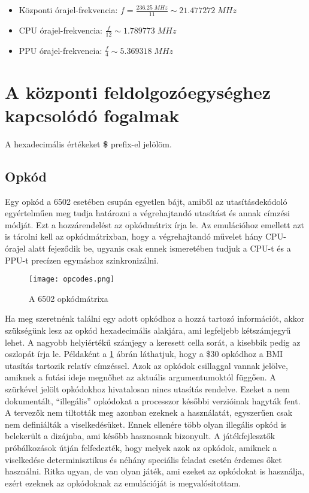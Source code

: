 \begin{itemize}
	\item Központi órajel-frekvencia: $ f = \frac{236.25\;MHz}{11} \sim 21.477272\; MHz $
	\item CPU órajel-frekvencia: $ \frac{f}{12} \sim 1.789773 \; MHz  $
	\item PPU órajel-frekvencia: $ \frac{f}{4}  \sim 5.369318 \; MHz $
\end{itemize}

\section{A központi feldolgozóegységhez kapcsolódó fogalmak}

\begin{note}
	A hexadecimális értékeket \textbf{\$} prefix-el jelölöm.
\end{note}

\subsection{Opkód}
Egy opkód \cite{6502desc, 6502opc} a 6502 esetében csupán egyetlen bájt, amiből az utasításdekódoló egyértelműen meg tudja határozni a végrehajtandó utasítást és annak címzési módját.
Ezt a hozzárendelést az opkódmátrix írja le. Az emulációhoz emellett azt is tárolni kell az opkódmátrixban, hogy a végrehajtandó művelet hány CPU-órajel alatt fejeződik be, ugyanis csak ennek ismeretében tudjuk a CPU-t és a PPU-t precízen egymáshoz szinkronizálni.

\begin{figure}[H]
	\centering
	\texttt{[image: opcodes.png]}
	\caption{A 6502 opkódmátrixa}
	\label{fig:opcodes}
\end{figure}

Ha meg szeretnénk találni egy adott opkódhoz a hozzá tartozó információt, akkor szükségünk lesz az opkód hexadecimális alakjára, ami legfeljebb kétszámjegyű lehet. A nagyobb helyiértékű számjegy a keresett cella sorát, a kisebbik pedig az oszlopát írja le. Példaként a \ref{fig:opcodes} ábrán láthatjuk, hogy a \$30 opkódhoz a BMI utasítás tartozik relatív címzéssel.
Azok az opkódok csillaggal vannak jelölve, amiknek a futási ideje megnőhet az aktuális argumentumoktól függően.
A szürkével jelölt opkódokhoz hivatalosan nincs utasítás rendelve. 
Ezeket a nem dokumentált, ``illegális'' \cite{illegal} opkódokat a processzor későbbi 
verzióinak hagyták fent. A tervezők nem tiltották meg azonban ezeknek a használatát, 
egyszerűen csak nem definiálták a viselkedésüket. Ennek ellenére több olyan illegális opkód is belekerült a dizájnba, ami később hasznosnak bizonyult. A játékfejlesztők próbálkozások útján
felfedezték, hogy melyek azok az opkódok, amiknek a viselkedése determinisztikus és néhány speciális feladat esetén érdemes őket használni.
Ritka ugyan, de van olyan játék, ami ezeket az opkódokat is használja, ezért ezeknek az opkódoknak az emulációját is megvalósítottam.

